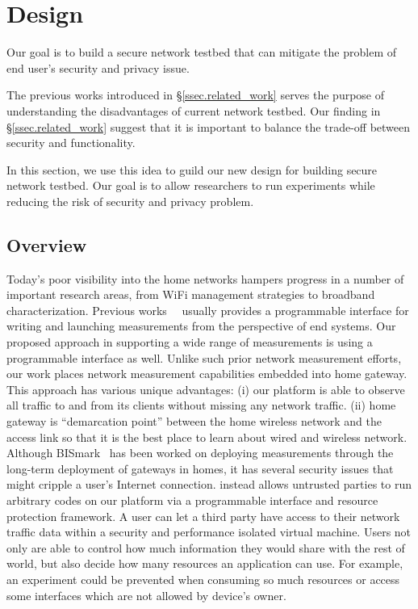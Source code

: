 \section{\sysname  Design}
\label{sec.design}
Our goal is to build a secure network testbed that can mitigate the problem 
of end user's security and privacy issue. 

The previous works introduced in \S{\ref{ssec.related_work}} serves the 
purpose of understanding the disadvantages of current network testbed. Our 
finding in \S{\ref{ssec.related_work}} suggest that it is important to 
balance the trade-off between security and functionality.

In this section, we use this idea to guild our new design for building 
secure network testbed. Our goal is to allow researchers to run experiments 
while reducing the risk of security and privacy problem.

\subsection{Overview}
Today's poor visibility into the home networks hampers progress in a number 
of important research areas, from WiFi management strategies to broadband 
characterization. Previous works~\cite{sanchez2014measurement}~\cite{
dhawan2012fathom} usually provides a programmable interface for writing and 
launching measurements from the perspective of end systems. Our proposed 
approach in supporting a wide range of measurements is using a programmable 
interface as well. Unlike such prior network measurement efforts, our work 
places network measurement capabilities embedded into home gateway. This 
approach has various unique advantages: (i) our platform is able to observe 
all traffic to and from its clients without missing any network traffic. (ii)
home gateway is “demarcation point” between the home wireless network and 
the access link so that it is the best place to learn about wired and 
wireless network. Although BISmark~\cite{183951} has been worked on 
deploying measurements  through the long-term deployment of gateways in 
homes, it has several security issues that might cripple a user's Internet 
connection. \sysname instead allows untrusted parties to run arbitrary codes 
on our platform via a programmable interface and resource protection 
framework. A user can let a third party have access to their network traffic 
data within a security and performance isolated virtual machine. Users not 
only are able to control how much information they would share with the rest 
of world, but also decide how many resources an application can use. For 
example, an experiment could be prevented when consuming so much resources 
or access some interfaces which are not allowed by device's owner. 

